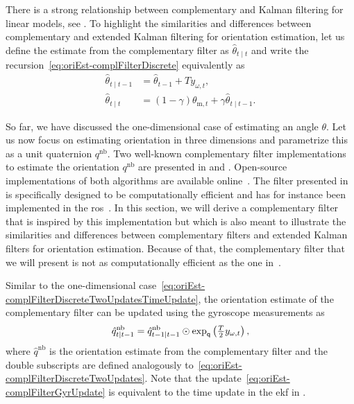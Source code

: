 There is a strong relationship between complementary and Kalman filtering for linear models, see \eg \cite{higgins:1975,brown:1972}. To highlight the similarities and differences between complementary and extended Kalman filtering for orientation estimation, let us define the estimate from the complementary filter as $\hat{\theta}_{t \mid t}$ and write the recursion~\eqref{eq:oriEst-complFilterDiscrete} equivalently as 
\begin{subequations}
\label{eq:oriEst-complFilterDiscreteTwoUpdates}
\begin{align}
\hat{\theta}_{t \mid t-1} &= \hat{\theta}_{t-1} + T y_{\omega,t}, \label{eq:oriEst-complFilterDiscreteTwoUpdatesTimeUpdate} \\
\hat{\theta}_{t \mid t} &= ( 1 - \gamma ) \theta_{\text{m},t} + \gamma \hat{\theta}_{t \mid t-1}. \label{eq:oriEst-complFilterDiscreteTwoUpdatesMeasUpdate}
\end{align}
\end{subequations}

So far, we have discussed the one-dimensional case of estimating an angle $\theta$. Let us now focus on estimating orientation in three dimensions and parametrize this as a unit quaternion $q^\text{nb}$. Two well-known complementary filter implementations to estimate the orientation $q^\text{nb}$ are presented in \cite{mahonyHP:2008} and \cite{madgwickHV:2011}. Open-source implementations of both algorithms are available online~\citep{xio:2017}. The filter presented in \cite{madgwickHV:2011} is specifically designed to be computationally efficient and has for instance been implemented in the \gls{ros}~\citep{ros:2017}. In this section, we will derive a complementary filter that is inspired by this implementation but which is also meant to illustrate the similarities and differences between complementary filters and extended Kalman filters for orientation estimation. Because of that, the complementary filter that we will present is not as computationally efficient as the one in~\cite{madgwickHV:2011}. 

Similar to the one-dimensional case~\eqref{eq:oriEst-complFilterDiscreteTwoUpdatesTimeUpdate}, the orientation estimate of the complementary filter can be updated using the gyroscope measurements as 
\begin{align}
\label{eq:oriEst-complFilterGyrUpdate}
\hat{q}^\text{nb}_{t \mid t-1} = \hat{q}^\text{nb}_{t-1 \mid t-1} \odot \exp_\mathsf{q} \left( \tfrac{T}{2} y_{\omega,t} \right),
\end{align}
where $\hat{q}^\text{nb}$ is the orientation estimate from the complementary filter and the double subscripts are defined analogously to~\eqref{eq:oriEst-complFilterDiscreteTwoUpdates}. Note that the update~\eqref{eq:oriEst-complFilterGyrUpdate} is equivalent to the time update in the \gls{ekf} in . 

